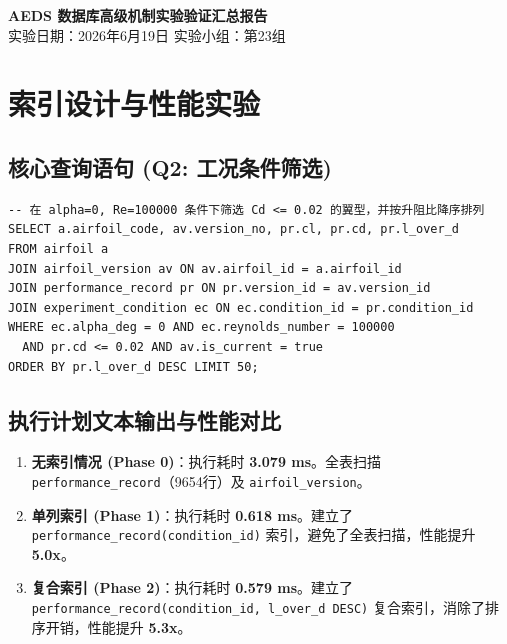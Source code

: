 \documentclass[UTF8,a4paper,11pt]{ctexart}
\begin{document}
\begin{center}
    {\Huge \bfseries AEDS 数据库高级机制实验验证汇总报告} \\
    \vspace{0.5cm}
    {\large 实验日期：2026年6月19日 \quad 实验小组：第23组}
\end{center}

\section{索引设计与性能实验}

\subsection{核心查询语句 (Q2: 工况条件筛选)}
\begin{lstlisting}[caption=工况条件筛选核心 SQL]
-- 在 alpha=0, Re=100000 条件下筛选 Cd <= 0.02 的翼型，并按升阻比降序排列
SELECT a.airfoil_code, av.version_no, pr.cl, pr.cd, pr.l_over_d
FROM airfoil a
JOIN airfoil_version av ON av.airfoil_id = a.airfoil_id
JOIN performance_record pr ON pr.version_id = av.version_id
JOIN experiment_condition ec ON ec.condition_id = pr.condition_id
WHERE ec.alpha_deg = 0 AND ec.reynolds_number = 100000
  AND pr.cd <= 0.02 AND av.is_current = true
ORDER BY pr.l_over_d DESC LIMIT 50;
\end{lstlisting}

\subsection{执行计划文本输出与性能对比}

\begin{tcolorbox}[colframe=mainblue, title=实验阶段对比结果]
\begin{enumerate}
    \item \textbf{无索引情况 (Phase 0)}：执行耗时 \textbf{3.079 ms}。全表扫描 \texttt{performance\_record}（9654行）及 \texttt{airfoil\_version}。
    \item \textbf{单列索引 (Phase 1)}：执行耗时 \textbf{0.618 ms}。建立了 \texttt{performance\_record(condition\_id)} 索引，避免了全表扫描，性能提升 \textbf{5.0x}。
    \item \textbf{复合索引 (Phase 2)}：执行耗时 \textbf{0.579 ms}。建立了 \texttt{performance\_record(condition\_id, l\_over\_d DESC)} 复合索引，消除了排序开销，性能提升 \textbf{5.3x}。
\end{enumerate}
\end{tcolorbox}
\end{document}
